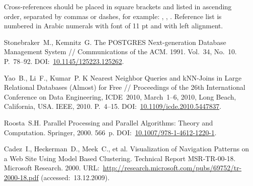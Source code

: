 \documentclass[11pt, oneside, a4paper]{article}
\begin{document}
Cross-references should be placed in square brackets and listed in ascending order, separated by commas or dashes, for example: \cite{stonebraker}, \cite{stonebraker,yao,roosta},  \cite{stonebraker,cadez}. Reference list is numbered in Arabic numerals with font of 11 pt and with left alignment.

\begin{biblio}

Stonebraker~M., Kemnitz~G. The POSTGRES Next-generation Database Management System // Communications of the ACM. 1991. Vol.~34, No.~10. P.~78--92.
DOI:~\href{http://dx.doi.org/10.1145/125223.125262}{10.1145/125223.125262}.

Yao~B., Li~F., Kumar~P. K Nearest Neighbor Queries and kNN-Joins in Large Relational Databases (Almost) for Free // Proceedings of the 26th International Conference on Data Engineering, ICDE~2010, March~1--6, 2010, Long Beach, California, USA. IEEE, 2010. P.~4--15. DOI:~\href{http://dx.doi.org/10.1109/icde.2010.5447837}{10.1109/icde.2010.5447837}.

Roosta~S.H. Parallel Processing and Parallel Algorithms: Theory and Computation. Springer, 2000. 566~p. DOI:~\href{http://dx.doi.org/10.1007/978-1-4612-1220-1}{10.1007/978-1-4612-1220-1}.

Cadez~I., Heckerman~D., Meek~C., et al. Visualization of Navigation Patterns on a Web Site Using Model Based Clustering. Technical Report MSR-TR-00-18. Microsoft Research. 2000. URL:~\href{http://research.microsoft.com/pubs/69752/tr-2000-18.pdf}{http://research.microsoft.com/pubs/69752/tr-2000-18.pdf} (accessed:~13.12.2009).


\end{biblio}
\end{document}
